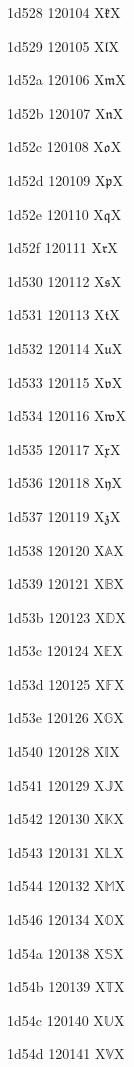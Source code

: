 \documentclass[11pt]{article}
\begin{document}
1d528 120104 X{\ensuremath{\mathfrak{k}}}X

1d529 120105 X{\ensuremath{\mathfrak{l}}}X

1d52a 120106 X{\ensuremath{\mathfrak{m}}}X

1d52b 120107 X{\ensuremath{\mathfrak{n}}}X

1d52c 120108 X{\ensuremath{\mathfrak{o}}}X

1d52d 120109 X{\ensuremath{\mathfrak{p}}}X

1d52e 120110 X{\ensuremath{\mathfrak{q}}}X

1d52f 120111 X{\ensuremath{\mathfrak{r}}}X

1d530 120112 X{\ensuremath{\mathfrak{s}}}X

1d531 120113 X{\ensuremath{\mathfrak{t}}}X

1d532 120114 X{\ensuremath{\mathfrak{u}}}X

1d533 120115 X{\ensuremath{\mathfrak{v}}}X

1d534 120116 X{\ensuremath{\mathfrak{w}}}X

1d535 120117 X{\ensuremath{\mathfrak{x}}}X

1d536 120118 X{\ensuremath{\mathfrak{y}}}X

1d537 120119 X{\ensuremath{\mathfrak{z}}}X

1d538 120120 X{\ensuremath{\mathbb{A}}}X

1d539 120121 X{\ensuremath{\mathbb{B}}}X

1d53b 120123 X{\ensuremath{\mathbb{D}}}X

1d53c 120124 X{\ensuremath{\mathbb{E}}}X

1d53d 120125 X{\ensuremath{\mathbb{F}}}X

1d53e 120126 X{\ensuremath{\mathbb{G}}}X

1d540 120128 X{\ensuremath{\mathbb{I}}}X

1d541 120129 X{\ensuremath{\mathbb{J}}}X

1d542 120130 X{\ensuremath{\mathbb{K}}}X

1d543 120131 X{\ensuremath{\mathbb{L}}}X

1d544 120132 X{\ensuremath{\mathbb{M}}}X

1d546 120134 X{\ensuremath{\mathbb{O}}}X

1d54a 120138 X{\ensuremath{\mathbb{S}}}X

1d54b 120139 X{\ensuremath{\mathbb{T}}}X

1d54c 120140 X{\ensuremath{\mathbb{U}}}X

1d54d 120141 X{\ensuremath{\mathbb{V}}}X
\end{document}
